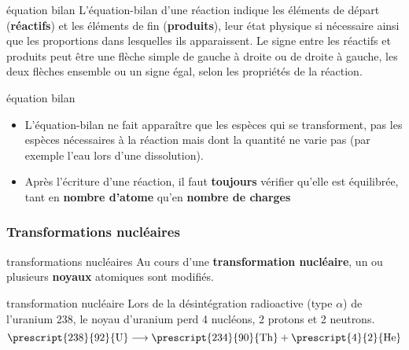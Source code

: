 \documentclass[../main/main.tex]{subfiles}
\begin{document}
\begin{tcbraster}[raster columns=2, raster equal height=rows]
    \begin{defi}[label=def:eqbil]{équation bilan}
        L'équation-bilan d'une réaction indique les éléments de
        départ (\textbf{réactifs}) et les éléments de fin (\textbf{produits}),
        leur état physique si nécessaire ainsi que les proportions dans
        lesquelles ils apparaissent. Le signe entre les réactifs et produits
        peut être une flèche simple de gauche à droite ou de droite à gauche,
        les deux flèches ensemble ou un signe égal, selon les propriétés de la
        réaction.
    \end{defi}
    \begin{rema}[label=rema:eqbil]{équation bilan}
        \begin{itemize}
            \item L'équation-bilan ne fait apparaître que les espèces qui se
                transforment, pas les espèces nécessaires à la réaction
                mais dont la quantité ne varie pas (par
                exemple l'eau lors d'une dissolution).
            \item Après l'écriture d'une réaction, il faut \textbf{toujours}
                vérifier qu'elle est équilibrée, tant en \textbf{nombre d'atome}
                qu'en \textbf{nombre de charges}
        \end{itemize}
    \end{rema}
\end{tcbraster}

\subsubsection{Transformations nucléaires}

\begin{tcbraster}[raster columns=2, raster equal height=rows]
    \begin{defi}[label=def:transnuc]{transformations nucléaires}
        Au cours d'une \textbf{transformation nucléaire}, un ou plusieurs
        \textbf{noyaux} atomiques sont modifiés.
    \end{defi}
    \begin{exem}[label=exem:transnuc]{transformation nucléaire}
        Lors de la désintégration radioactive (type $\alpha$) de l'uranium 238,
        le noyau d'uranium perd 4 nucléons, 2 protons et 2 neutrons.
        \begin{equation*}
            \prescript{238}{92}{\mathrm{U}}
            \longrightarrow 
            \prescript{234}{90}{\mathrm{Th}} + \prescript{4}{2}{\mathrm{He}}
        \end{equation*}
    \end{exem}
\end{tcbraster}
\end{document}
